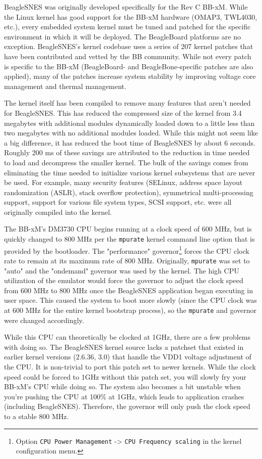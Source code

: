 BeagleSNES was originally developed specifically for the Rev C BB-xM. While the Linux kernel has good support for the BB-xM hardware (OMAP3, TWL4030, etc.), every embedded system kernel must be tuned and patched for the specific environment in which it will be deployed.  The BeagleBoard platforms are no exception.  BeagleSNES's kernel codebase uses a series of 207 kernel patches that have been contributed and vetted by the BB community.  While not every patch is specific to the BB-xM (BeagleBoard- and BeagleBone-specific patches are also applied), many of the patches increase system stability by improving voltage core management and thermal management.

The kernel itself has been compiled to remove many features that aren't needed for BeagleSNES.  This has reduced the compressed size of the kernel from 3.4 megabytes with additional modules dynamically loaded down to a little less than two megabytes with no additional modules loaded.  While this might not seem like a big difference, it has reduced the boot time of BeagleSNES by about 6 seconds.  Roughly 200 ms of these savings are attributed to the reduction in time needed to load and decompress the smaller kernel.  The bulk of the savings comes from eliminating the time needed to initialize various kernel subsystems that are never be used.  For example, many security features (SELinux, address space layout randomization (ASLR), stack overflow protection), symmetrical multi-processing support, support for various file system types, SCSI support, etc. were all originally compiled into the kernel. 

The BB-xM's DM3730 CPU begins running at a clock speed of 600 MHz, but is quickly changed to 800 MHz per the \texttt{mpurate} kernel command line option that is provided by the bootloader.  The "performance" governor\footnote{Option \texttt{CPU Power Management} -> \texttt{CPU Frequency scaling} in the kernel configuration menu.} forces the CPU clock rate to remain at its maximum rate of 800 MHz.  Originally, \texttt{mpurate} was set to "auto" and the "ondemand" governor was used by the kernel.  The high CPU utilization of the emulator would force the governor to adjust the clock speed from 600 MHz to 800 MHz once the BeagleSNES application began executing in user space.  This caused the system to boot more slowly (since the CPU clock was at 600 MHz for the entire kernel bootstrap process), so the \texttt{mpurate} and governor were changed accordingly.   

While this CPU can theoretically be clocked at 1GHz, there are a few problems with doing so. The BeagleSNES kernel source lacks a patchset that existed in earlier kernel versions (2.6.36, 3.0) that handle the VDD1 voltage adjustment of the CPU. It is non-trivial to port this patch set to newer kernels. While the clock speed could be forced to 1GHz without this patch set, you will slowly fry your BB-xM's CPU while doing so. The system also becomes a bit unstable when you're pushing the CPU at 100\% at 1GHz, which leads to application crashes (including BeagleSNES). Therefore, the governor will only push the clock speed to a stable 800 MHz.


